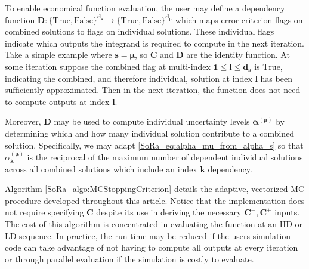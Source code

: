 \documentclass[graybox]{svmult}
\begin{document}
To enable economical function evaluation, the user may define a dependency function $\boldsymbol{D}: \{\text{True},\text{False}\}^{\boldsymbol{d}_{\boldsymbol{s}}} \to \{\text{True},\text{False}\}^{\boldsymbol{d}_{\boldsymbol{\mu}}}$ which maps error criterion flags on combined solutions to flags on individual solutions. These individual flags indicate which outputs the integrand is required to compute in the next iteration. Take a simple example where  $\boldsymbol{s}=\boldsymbol{\mu}$, so $\boldsymbol{C}$ and $\boldsymbol{D}$ are the identity function. At some iteration suppose the combined flag at multi-index $\boldsymbol{1} \leq \boldsymbol{l} \leq \boldsymbol{d}_{\boldsymbol{s}}$ is $\text{True}$, indicating the combined, and therefore individual, solution at index $\boldsymbol{l}$ has been sufficiently approximated. Then in the next iteration, the function does not need to compute outputs at index $\boldsymbol{l}$.

Moreover, $\boldsymbol{D}$ may be used to compute individual uncertainty levels $\boldsymbol{\alpha}^{(\boldsymbol{\mu})}$ by determining which and how many individual solution contribute to a combined solution. Specifically, we may adapt \eqref{SoRa_eq:alpha_mu_from_alpha_s} so that 
$\alpha_{\boldsymbol{k}}^{(\boldsymbol{\mu})}$ is the reciprocal of the maximum number of dependent individual solutions across all combined solutions which include an index $\boldsymbol{k}$ dependency.

Algorithm \ref{SoRa_algo:MCStoppingCriterion} details the adaptive, vectorized MC procedure developed throughout this article. Notice that the implementation does not require specifying $\boldsymbol{C}$ despite its use in deriving the necessary $\boldsymbol{C}^-,\boldsymbol{C}^+$ inputs. The cost of this algorithm is concentrated in evaluating the function at an IID or LD sequence. In practice, the run time may be reduced if the users simulation code can take advantage of not having to compute all outputs at every iteration or through parallel evaluation if the simulation is costly to evaluate.
\end{document}
